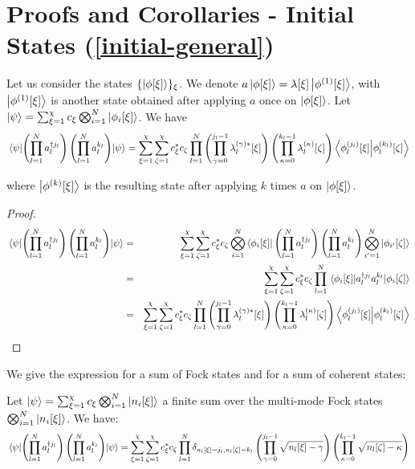 \section{Proofs and Corollaries - Initial States (\autoref{initial-general})}
\label{init-state-appendix}
\begin{theorem}
Let us consider the states $\{\ket{\phi[\xi]}\}_\xi$. We denote $a \ket{\phi[\xi]} = \lambda[\xi] \ket{\phi^{(1)}[\xi]}$, with $\ket{\phi^{(1)}[\xi]}$ is another state obtained after applying $a$ once on $\ket{\phi[\xi]}$. Let $\ket{\psi} = \sum_{\xi=1}^\chi c_\xi
\bigotimes_{i=1}^N \ket{\phi_i[\xi]}$. We have
\begin{equation}
    \mel{\psi}{\left(\prod_{l=1}^N a^{\dagger j_l}_l\right) \left(\prod_{l=1}^N a^{k_l}_l\right)}{\psi} = \sum_{\xi=1}^\chi \sum_{\zeta=1}^\chi c^*_\xi c_\zeta \prod_{l=1}^N \left(\prod_{\gamma = 0}^{j_l - 1} \lambda^{(\gamma)*}_l[\xi]\right) \left(\prod_{\kappa = 0}^{k_l - 1} \lambda^{(\kappa)}_l[\zeta]\right) \braket{\phi^{(j_l)}_l[\xi]}{\phi^{(k_l)}_{l}[\zeta]}
\end{equation}

where $\ket{\phi^{(k)}[\xi]}$ is the resulting state after applying $k$ times $a$ on $\ket{\phi[\xi]}$.
\end{theorem}
\begin{proof}
\begin{eqnarray}
    \mel{\psi}{\left(\prod_{l=1}^N a^{\dagger j_l}_l\right) \left(\prod_{l=1}^N a^{k_l}_l\right)}{\psi} &=& \sum_{\xi=1}^\chi \sum_{\zeta=1}^\chi c^*_\xi c_\zeta \bigotimes_{i=1}^N \bra{\phi_i[\xi]} \left(\prod_{l=1}^N a^{\dagger j_l}_l\right) \left(\prod_{l=1}^N a^{k_l}_l\right) \bigotimes_{i'=1}^N \ket{\phi_{i'}[\zeta]}\nonumber\\
    &=& \sum_{\xi=1}^\chi \sum_{\zeta=1}^\chi c^*_\xi c_\zeta
    \prod_{l=1}^N\mel{\phi_i[\xi]}{a^{\dagger j_l}_l a^{k_l}_l}{\phi_i[\zeta]}\nonumber\\
    &=& \sum_{\xi=1}^\chi \sum_{\zeta=1}^\chi c^*_\xi c_\zeta \prod_{l=1}^N \left(\prod_{\gamma = 0}^{j_l - 1} \lambda^{(\gamma)*}_l[\xi]\right) \left(\prod_{\kappa = 0}^{k_l - 1} \lambda^{(\kappa)}_l[\zeta]\right) \braket{\phi^{(j_l)}_l[\xi]}{\phi^{(k_l)}_{l}[\zeta]}\nonumber
\end{eqnarray}
\end{proof}

We give the expression for a sum of Fock states and for a sum of coherent states:

\begin{corollary}
    Let $\ket{\psi} = \sum_{\xi=1}^\chi c_\xi
\bigotimes_{i=1}^N \ket{n_i[\xi]}$ a finite sum over the multi-mode Fock states $\bigotimes_{i=1}^N \ket{n_i[\xi]}$. We have:
\begin{equation}
    \mel{\psi}{\left(\prod_{l=1}^N a^{\dagger j_l}_l\right) \left(\prod_{l=1}^N a^{k_l}_l\right)}{\psi} = \sum_{\xi=1}^\chi \sum_{\zeta=1}^\chi c^*_\xi c_\zeta \prod_{l=1}^N \delta_{n_l[\xi] - j_l, n_l[\zeta] - k_l} \left(\prod_{\gamma = 0}^{j_l - 1} \sqrt{n_l[\xi] - \gamma}\right) \left(\prod_{\kappa = 0}^{k_l - 1} \sqrt{n_l[\zeta] - \kappa}\right)
\end{equation}
\end{corollary}

